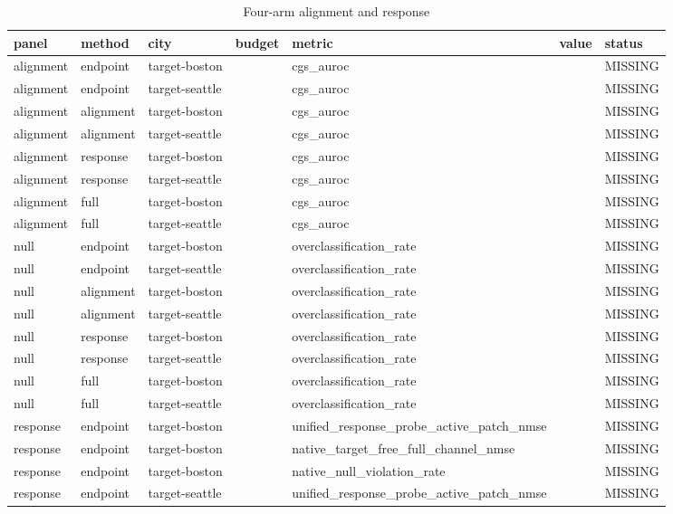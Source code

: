 \begin{longtable}{lllllll}
\caption{Four-arm alignment and response}\\
\toprule
panel & method & city & budget & metric & value & status \\
\midrule\endhead
alignment & endpoint & target-boston &  & cgs\_auroc &  & MISSING \\
alignment & endpoint & target-seattle &  & cgs\_auroc &  & MISSING \\
alignment & alignment & target-boston &  & cgs\_auroc &  & MISSING \\
alignment & alignment & target-seattle &  & cgs\_auroc &  & MISSING \\
alignment & response & target-boston &  & cgs\_auroc &  & MISSING \\
alignment & response & target-seattle &  & cgs\_auroc &  & MISSING \\
alignment & full & target-boston &  & cgs\_auroc &  & MISSING \\
alignment & full & target-seattle &  & cgs\_auroc &  & MISSING \\
null & endpoint & target-boston &  & overclassification\_rate &  & MISSING \\
null & endpoint & target-seattle &  & overclassification\_rate &  & MISSING \\
null & alignment & target-boston &  & overclassification\_rate &  & MISSING \\
null & alignment & target-seattle &  & overclassification\_rate &  & MISSING \\
null & response & target-boston &  & overclassification\_rate &  & MISSING \\
null & response & target-seattle &  & overclassification\_rate &  & MISSING \\
null & full & target-boston &  & overclassification\_rate &  & MISSING \\
null & full & target-seattle &  & overclassification\_rate &  & MISSING \\
response & endpoint & target-boston &  & unified\_response\_probe\_active\_patch\_nmse &  & MISSING \\
response & endpoint & target-boston &  & native\_target\_free\_full\_channel\_nmse &  & MISSING \\
response & endpoint & target-boston &  & native\_null\_violation\_rate &  & MISSING \\
response & endpoint & target-seattle &  & unified\_response\_probe\_active\_patch\_nmse &  & MISSING \\

\end{longtable}
